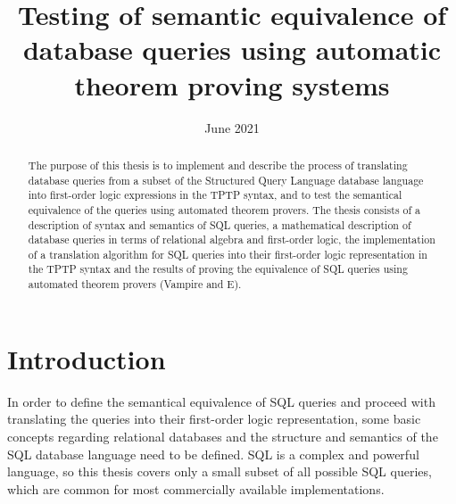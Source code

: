 \documentclass[magisterska,en]{pracamgr}
\title{Testing of semantic equivalence of database queries using automatic theorem proving systems}
\date{June 2021}
\begin{document}
\maketitle

\begin{abstract}
The purpose of this thesis is to implement and describe the process of translating database queries from a subset of the Structured Query Language database language into first-order logic expressions in the TPTP syntax, and to test the semantical equivalence of the queries using automated theorem provers.
The thesis consists of a description of syntax and semantics of SQL queries, a mathematical description of database queries in terms of relational algebra and first-order logic, the implementation of a translation algorithm for SQL queries into their first-order logic representation in the TPTP syntax and the results of proving the equivalence of SQL queries using automated theorem provers (Vampire and E).
\end{abstract}

\tableofcontents
\lstlistoflistings
\listoftables

 

\lstset{style=mystyle}
\setlength{\grammarparsep}{1pt plus 0pt minus 0pt} %
\setlength{\grammarindent}{13em} %

\chapter{Introduction}

In order to define the semantical equivalence of SQL queries and proceed with translating the queries into their first-order logic representation, some basic concepts regarding relational databases and the structure and semantics of the SQL database language need to be defined. SQL is a complex and powerful language, so this thesis covers only a small subset of all possible SQL queries, which are common for most commercially available implementations.
\end{document}
